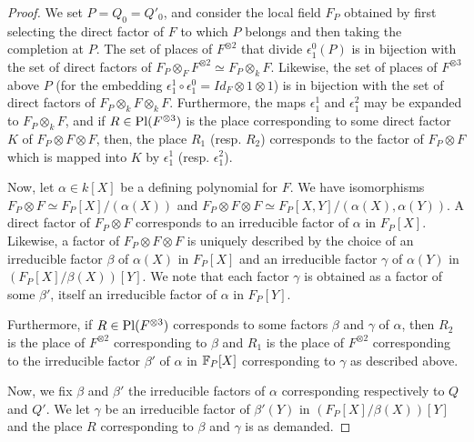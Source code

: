 \begin{proof}
    We set \(P = Q_0 = Q'_0\), and consider the local field \(F_P\) obtained by first selecting the direct factor of \(F\) to which \(P\) belongs and then taking the completion at \(P\). The set of places of \(F^{\otimes 2}\) that divide \(\epsilon_1^0(P)\) is in bijection with the set of direct factors of \(F_P \otimes_F F^{\otimes 2} \simeq F_P \otimes_k F\). Likewise, the set of places of \(F^{\otimes 3}\) above \(P\) (for the embedding \(\epsilon_1^1 \circ \epsilon_1^0 = Id_F \otimes 1 \otimes 1\)) is in bijection with the set of direct factors of \(F_P \otimes_k F \otimes_k F\). Furthermore, the maps \(\epsilon_1^1\) and \(\epsilon_1^2\) may be expanded to \(F_P \otimes_k F\), and if \(R \in \operatorname{Pl}(F^{\otimes 3})\) is the place corresponding to some direct factor \(K\) of \(F_P \otimes F \otimes F\), then, the place \(R_1\) (resp. \(R_2\)) corresponds to the factor of \(F_P \otimes F\) which is mapped into \(K\) by \(\epsilon_1^1\) (resp. \(\epsilon_1^2\)).

    Now, let \(\alpha \in k[X]\) be a defining polynomial for \(F\). We have isomorphisms \(F_P \otimes F \simeq F_P[X]/(\alpha(X))\) and \(F_P \otimes F \otimes F \simeq F_P[X,Y]/(\alpha(X),\alpha(Y))\). A direct factor of \(F_P \otimes F\) corresponds to an irreducible factor of \(\alpha\) in \(F_P[X]\). Likewise, a factor of \(F_P \otimes F \otimes F\) is uniquely described by the choice of an irreducible factor \(\beta\) of \(\alpha(X)\) in \(F_P[X]\) and an irreducible factor \(\gamma\) of \(\alpha(Y)\) in \(\left(F_P[X]/\beta(X)\right)[Y]\). We note that each factor \(\gamma\) is obtained as a factor of some \(\beta'\), itself an irreducible factor of \(\alpha\) in \(F_P[Y]\).

    Furthermore, if \(R \in \operatorname{Pl}(F^{\otimes 3})\) corresponds to some factors \(\beta\) and \(\gamma\) of \(\alpha\), then \(R_2\) is the place of \(F^{\otimes 2}\) corresponding to \(\beta\) and \(R_1\) is the place of \(F^{\otimes 2}\) corresponding to the irreducible factor \(\beta'\) of \(\alpha\) in \(\mathbb{F}_P[X]\) corresponding to \(\gamma\) as described above.

    Now, we fix \(\beta\) and \(\beta'\) the irreducible factors of \(\alpha\) corresponding respectively to \(Q\) and \(Q'\). We let \(\gamma\) be an irreducible factor of \(\beta'(Y)\) in \(\left(F_P[X]/\beta(X)\right)[Y]\) and the place \(R\) corresponding to \(\beta\) and \(\gamma\) is as demanded.
\end{proof}

